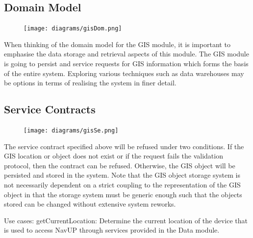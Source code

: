 \documentclass[12pt]{article}
\begin{document}
\subsection{Domain Model}
\begin{figure}
\centering
\texttt{[image: diagrams/gisDom.png]}

\end{figure}
When thinking of the domain model for the GIS module, it is important to emphasise the data storage and retrieval aspects of this module. The GIS module is going to persist and service requests for GIS information which forms the basis of the entire system. Exploring various techniques such as data warehouses may be options in terms of realising the system in finer detail.

\subsection{Service Contracts}
\begin{figure}[h]
\centering
\texttt{[image: diagrams/gisSe.png]}

\end{figure}
The service contract specified above will be refused under two conditions. If the GIS location or object does not exist or if the request fails the validation protocol, then the contract can be refused. Otherwise, the GIS object will be persisted and stored in the system. Note that the GIS object storage system is not necessarily dependent on a strict coupling to the representation of the GIS object in that the storage system must be generic enough such that the objects stored can be changed without extensive system reworks.

Use cases:
getCurrentLocation: Determine the current location of the device that is used to access NavUP through services provided in the Data module.
\end{document}
